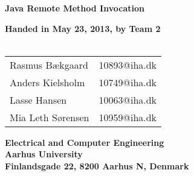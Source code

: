 \documentclass[a4paper,10pt]{report}
\begin{document}
\begin{titlepage}
\begin{center}
{\LARGE \textbf{Java Remote Method Invocation}}


\vspace{4cm}
\textbf{Handed in May 23, 2013, by Team 2}\\~\\
\begin{tabular}{ll}
Rasmus Bækgaard  & 10893@iha.dk \\
Anders Kielsholm  & 10749@iha.dk \\
Lasse Hansen  & 10063@iha.dk \\
Mia Leth Sørensen & 10959@iha.dk \\
\end{tabular}
\vfill
\textbf{Electrical and Computer Engineering}\\
\textbf{Aarhus University}\\
\textbf{Finlandsgade 22, 8200 Aarhus N, Denmark}
\end{center}
\end{titlepage}

















\end{document}
